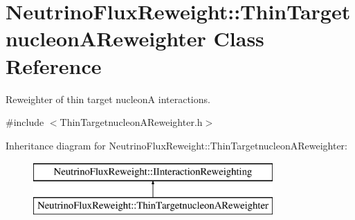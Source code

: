 \hypertarget{class_neutrino_flux_reweight_1_1_thin_targetnucleon_a_reweighter}{\section{Neutrino\-Flux\-Reweight\-:\-:Thin\-Targetnucleon\-A\-Reweighter Class Reference}
\label{class_neutrino_flux_reweight_1_1_thin_targetnucleon_a_reweighter}
}


Reweighter of thin target nucleon\-A interactions.  




{\ttfamily \#include $<$Thin\-Targetnucleon\-A\-Reweighter.\-h$>$}

Inheritance diagram for Neutrino\-Flux\-Reweight\-:\-:Thin\-Targetnucleon\-A\-Reweighter\-:\begin{figure}[H]
\begin{center}
\leavevmode
\includegraphics[height=2.000000cm]{class_neutrino_flux_reweight_1_1_thin_targetnucleon_a_reweighter}
\end{center}
\end{figure}
